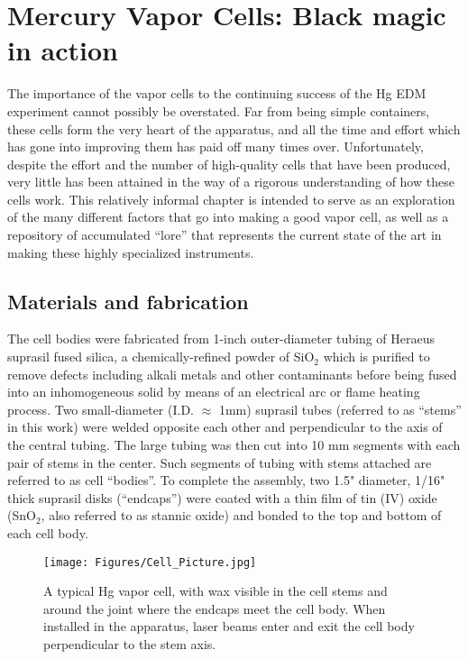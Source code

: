\documentclass [10pt, twoside] {uwthesis}[2012/04/02]
\begin{document}
\cleardoublepage

\chapter{Mercury Vapor Cells: Black magic in action}
\label{CellChap}
The importance of the vapor cells to the continuing success of the Hg EDM experiment cannot possibly be overstated. Far from being simple containers, these cells form the very heart of the apparatus, and all the time and effort which has gone into improving them has paid off many times over. Unfortunately, despite the effort and the number of high-quality cells that have been produced, very little has been attained in the way of a rigorous understanding of how these cells work. This relatively informal chapter is intended to serve as an exploration of the many different factors that go into making a good vapor cell, as well as a repository of accumulated ``lore'' that represents the current state of the art in making these highly specialized instruments. 

\section{Materials and fabrication}
The cell bodies were fabricated from 1-inch outer-diameter tubing of Heraeus suprasil fused silica, a chemically-refined powder of SiO$_2$ which is purified to remove defects including alkali metals and other contaminants before being fused into an inhomogeneous solid by means of an electrical arc or flame heating process. Two small-diameter (I.D. $\approx$ 1mm) suprasil tubes (referred to as ``stems'' in this work) were welded opposite each other and perpendicular to the axis of the central tubing. The large tubing was then cut into 10 mm segments with each pair of stems in the center. Such segments of tubing with stems attached are referred to as cell ``bodies''. To complete the assembly, two 1.5" diameter, 1/16" thick suprasil disks (``endcaps'') were coated with a thin film of tin (IV) oxide (SnO$_2$, also referred to as stannic oxide) and bonded to the top and bottom of each cell body. 

\begin{figure}
\begin{center}
\texttt{[image: Figures/Cell\_Picture.jpg]}
\end{center}
\caption[A typical Hg vapor cell]%
{\narrower A typical Hg vapor cell, with wax visible in the cell stems and around the joint where the endcaps meet the cell body. When installed in the apparatus, laser beams enter and exit the cell body perpendicular to the stem axis.}
\label{HgCell}
\end{figure} 
\end{document}
